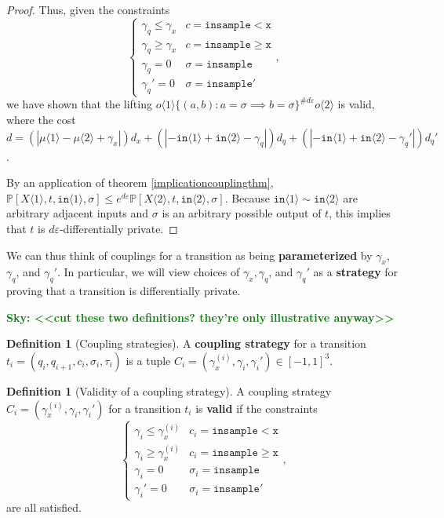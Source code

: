 \documentclass[12pt]{article}
\newcommand{\PP}{\mathbb{P}}
\newcommand{\gguard}[1][x]{\texttt{insample}\geq#1}
\newcommand{\lguard}[1][x]{\texttt{insample} < #1}
\newcommand{\brangle}[1]{\langle#1 \rangle}
\newcommand{\todo}[2]{\textcolor{#1}{\textbf{#2}}}
\newcommand{\sky}[1]{\todo{green}{Sky: <<#1>>}}
\theoremstyle{definition}
\newtheorem{defn}[thm]{Definition}
\begin{document}
\begin{proof}
Thus, given the constraints \[
  \begin{cases}
    \gamma_q\leq\gamma_x & c = \lguard[\texttt{x}]\\
    \gamma_q\geq\gamma_x & c = \gguard[\texttt{x}]\\
    \gamma_q=0 & \sigma = \texttt{insample}\\
    \gamma_q'=0 & \sigma = \texttt{insample}'
  \end{cases},
\]
we have shown that the lifting $o\brangle{1}\{(a, b): a=\sigma\implies b=\sigma\}^{\#d\varepsilon}o\brangle{2}$ is valid, where the cost $d = (|\mu\brangle{1}-\mu\brangle{2}+\gamma_x|)d_x+(|-\texttt{in}\brangle{1}+\texttt{in}\brangle{2}-\gamma_q|)d_q+(|-\texttt{in}\brangle{1}+\texttt{in}\brangle{2}-\gamma_q'|)d_q'$. 

By an application of theorem \ref{implicationcouplingthm}, $\PP[X\brangle{1}, t, \texttt{in}\brangle{1}, \sigma]\leq e^{d\varepsilon}\PP[X\brangle{2}, t, \texttt{in}\brangle{2}, \sigma]$. Because $\texttt{in}\brangle{1}\sim\texttt{in}\brangle{2}$ are arbitrary adjacent inputs and $\sigma$ is an arbitrary possible output of $t$, this implies that $t$ is $d\varepsilon$-differentially private. 
\end{proof}

We can thus think of couplings for a transition as being \textbf{parameterized} by $\gamma_x$, $\gamma_q$, and $\gamma_q'$. In particular, we will view choices of $\gamma_x, \gamma_q$, and $\gamma_q'$ as a \textbf{strategy} for proving that a transition is differentially private. 

\sky{cut these two definitions? they're only illustrative anyway}

\begin{defn}[Coupling strategies]
    A \textbf{coupling strategy} for a transition $t_i = (q_i, q_{i+1}, c_i, \sigma_i, \tau_i)$ is a tuple $C_i = (\gamma_x^{(i)}, \gamma_i, \gamma_i')\in [-1, 1]^3$. 
\end{defn}

\begin{defn}[Validity of a coupling strategy]
    A coupling strategy $C_i =(\gamma_x^{(i)}, \gamma_i, \gamma_i')$ for a transition $t_i$ is \textbf{valid} if the constraints \[
        \begin{cases}
          \gamma_i\leq\gamma_x^{(i)} & c_i = \lguard[\texttt{x}]\\
          \gamma_i\geq\gamma_x^{(i)} & c_i = \gguard[\texttt{x}]\\
          \gamma_i=0 & \sigma_i = \texttt{insample}\\
          \gamma_i'=0 & \sigma_i = \texttt{insample}'
        \end{cases},
      \]
      are all satisfied. 
\end{defn}
\end{document}

